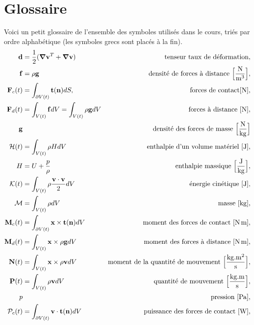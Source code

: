 \chapter{Glossaire}
  Voici un petit glossaire de l'ensemble des symboles utilisés dans le cours, triés par ordre alphabétique (les symboles grecs sont placés à la fin).
  \begingroup
  \allowdisplaybreaks
  \begin{align*}
    \vb{d} &= \frac{1}{2}(\grad\vb{v}^T + \grad\vb{v}) & \textrm{tenseur taux de déformation},\\
    \vb{f} &= \rho \vb{g} & \textrm{densité de forces à distance } \Big[\si{\frac{N}{m^3}}\Big], \\
    \mathcal{\vb{F}}_c (t) &= \int_{\partial V(t)} \vb{t}(\vb{n}) dS, & \textrm{forces de contact} [\si{N}],\\
    \mathcal{\vb{F}}_d (t) &= \int_{V(t)} \vb{f} dV = \int_{V(t)} \rho \vb{g} dV & \textrm{forces à distance } [\si{N}],\\
    \vb{g} & & \textrm {densité des forces de masse } \Big[\si{\frac{N}{kg}}\Big]\\
    \mathcal{H}(t) &= \int_{V(t)} \rho H dV & \textrm{enthalpie d'un volume matériel } [\si{J}],\\
    H &= U + \frac{p}{\rho} & \textrm{enthalpie massique } \Big[\si{\frac{J}{kg}}\Big],\\
    \mathcal{K}(t) &= \int_{V(t)} \rho \frac{\vb{v}\cdot\vb{v}}{2} dV & \textrm{énergie cinétique } [\si{J}],\\
    \mathcal{M} & = \int_{V(t)} \rho dV  & \textrm{masse [\si{kg}],}\\
    \mathcal{\vb{M}}_c (t) &= \int_{\partial V(t)} \vb{x} \times \vb{t}(\vb{n}) dV & \textrm{moment des forces de contact } [\si{N.m}],\\
    \mathcal{\vb{M}}_d (t) &= \int_{V(t)} \vb{x} \times \rho \vb{g} dV & \textrm{moment des forces à distance } [\si{N.m}],\\
    \mathcal{\vb{N}}(t) &= \int_{V(t)} \vb{x} \times \rho \vb{v} dV & \textrm{moment de la quantité de mouvement } \Big[\si{\frac{kg.m^2}{s}}\Big],\\
    \mathcal{\vb{P}}(t) &= \int_{V(t)} \rho \vb{v} dV & \textrm{quantité de mouvement } \Big[\si{\frac{kg.m}{s}}\Big],\\
    p & & \textrm{pression } [\si{Pa}],\\
    \mathcal{P}_c(t) &= \int_{\partial V(t)} \vb{v} \cdot \vb{t}(\vb{n}) dV & \textrm{puissance des forces de contact } [\si{W}], \\

\end{align*}
